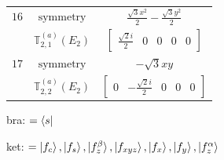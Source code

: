 \documentclass[fleqn,8pt,landscape]{jsarticle}
\begin{document}
\begin{longtable}{ccc}
$ 16 $ & $ \text{symmetry} $ & $ \frac{\sqrt{3} x^{2}}{2} - \frac{\sqrt{3} y^{2}}{2} $ \\
$  $ & $ \mathbb{T}_{2,1}^{(a)}(E_{2}) $ & $ \begin{bmatrix} \frac{\sqrt{2} i}{2} & 0 & 0 & 0 & 0 \end{bmatrix} $ \\ \hline
$ 17 $ & $ \text{symmetry} $ & $ - \sqrt{3} x y $ \\
$  $ & $ \mathbb{T}_{2,2}^{(a)}(E_{2}) $ & $ \begin{bmatrix} 0 & - \frac{\sqrt{2} i}{2} & 0 & 0 & 0 \end{bmatrix} $ \\ \hline
\end{longtable}
bra: $=\bra{s}$

\noindent
ket: $=\ket{f_{c}}, \ket{f_{s}}, \ket{f_{z}^{\beta}}, \ket{f_{xyz}}, \ket{f_{x}}, \ket{f_{y}}, \ket{f_{z}^{\alpha}}$
\renewcommand{\arraystretch}{1.6}
\end{document}
